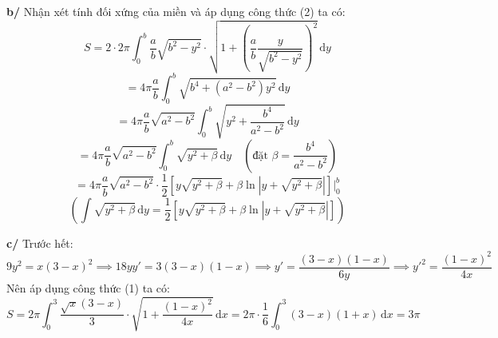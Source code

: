\bigskip

\noindent\textbf{b/} Nhận xét tính đối xứng của miền và áp dụng công thức (2) ta có:
\[
S = 2 \cdot 2\pi \int_{0}^{b} \frac{a}{b} \sqrt{b^2 - y^2} \cdot \sqrt{1 + \left( \frac{a}{b} \frac{y}{\sqrt{b^2 - y^2}} \right)^2} \, \mathrm{d}y
\]
\[
= 4\pi \frac{a}{b} \int_{0}^{b} \sqrt{b^4 + (a^2 - b^2)y^2} \, \mathrm{d}y
\]
\[
= 4\pi \frac{a}{b} \sqrt{a^2 - b^2} \int_{0}^{b} \sqrt{y^2 + \frac{b^4}{a^2 - b^2}} \, \mathrm{d}y
\]
\[
= 4\pi \frac{a}{b} \sqrt{a^2 - b^2} \int_{0}^{b} \sqrt{y^2 + \beta} \, \mathrm{d}y \quad \left( \text{đặt } \beta = \frac{b^4}{a^2 - b^2} \right)
\]
\[
= 4\pi \frac{a}{b} \sqrt{a^2 - b^2} \cdot \frac{1}{2} \left[ y \sqrt{y^2 + \beta} + \beta \ln |y + \sqrt{y^2 + \beta}| \right] \Bigg|_{0}^{b}
\]
\[
\left( \int \sqrt{y^2 + \beta} \, \mathrm{d}y = \frac{1}{2} \left[ y \sqrt{y^2 + \beta} + \beta \ln |y + \sqrt{y^2 + \beta}| \right] \right)
\]

\bigskip

\noindent\textbf{c/} Trước hết:
\[
9y^2 = x(3 - x)^2 \implies 18yy' = 3(3 - x)(1 - x) \implies y' = \frac{(3 - x)(1 - x)}{6y} \implies y'^2 = \frac{(1 - x)^2}{4x}
\]
Nên áp dụng công thức (1) ta có:
\[
S = 2\pi \int_{0}^{3} \frac{\sqrt{x}(3 - x)}{3} \cdot \sqrt{1 + \frac{(1 - x)^2}{4x}} \, \mathrm{d}x = 2\pi \cdot \frac{1}{6} \int_{0}^{3} (3 - x)(1 + x) \, \mathrm{d}x = 3\pi
\]
